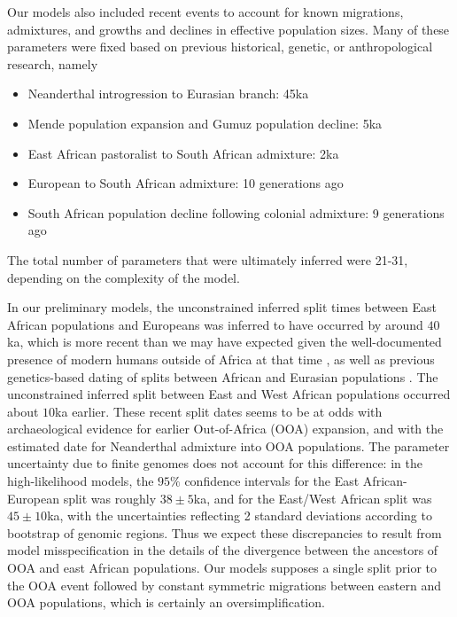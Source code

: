\documentclass[]{article}
\begin{document}
Our models also included recent events to account for known migrations,
admixtures, and growths and declines in effective population sizes. Many of
these parameters were fixed based on previous historical, genetic, or
anthropological research, namely
\begin{itemize}
    \item Neanderthal introgression to Eurasian branch: 45ka
    \item Mende population expansion and Gumuz population decline: 5ka \citep{Gopalan2022-pw}
    \item East African pastoralist to South African admixture: 2ka \citep{Uren2016-nn}
    \item European to South African admixture: 10 generations ago
    \item South African population decline following colonial admixture: 9 generations ago
\end{itemize}
The total number of parameters that were
ultimately inferred were 21-31, depending on the complexity
of the model.

In our preliminary models, the unconstrained inferred split times between East
African populations and Europeans was inferred to have occurred by around
$40$ka, which is more recent than we may have expected given the
well-documented presence of modern humans outside of Africa at that time
\citep[e.g.]{Hublin2020-nk,Hajdinjak2021-jo}, as well as previous
genetics-based dating of splits between African and Eurasian populations
\citep[e.g.]{Jouganous2017-pq,Kamm2020-vn}. The unconstrained inferred split
between East and West African populations occurred about $10$ka earlier. These
recent split dates seems to be at odds with archaeological evidence for earlier
Out-of-Africa (OOA) expansion, and with the estimated date for Neanderthal
admixture into OOA populations. The parameter uncertainty due to finite genomes
does not account for this difference: in the high-likelihood models, the $95\%$
confidence intervals for the East African-European split was roughly $38 \pm
5$ka, and for the East/West African split was $45 \pm 10$ka, with the
uncertainties reflecting 2 standard deviations according to bootstrap of
genomic regions.  Thus we expect these discrepancies to result from model
misspecification in the details of the divergence between the ancestors of OOA
and east African populations. Our models supposes a single split prior to the
OOA event followed by constant symmetric migrations between eastern and OOA
populations, which is certainly an oversimplification. 
\end{document}
